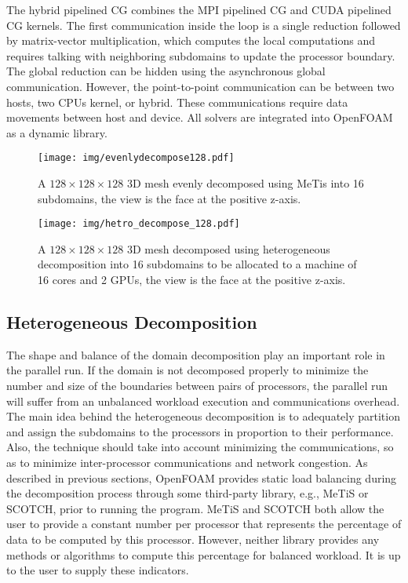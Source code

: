 \documentclass[3p,times]{elsarticle}
\begin{document}
The hybrid pipelined CG combines the MPI pipelined CG and CUDA pipelined CG kernels. The first communication inside the loop is a single reduction followed by matrix-vector multiplication, which computes the local computations and requires talking with neighboring subdomains to update the processor boundary. The global reduction can be hidden using the asynchronous global communication. However, the point-to-point communication can be between two hosts, two CPUs kernel, or hybrid. These communications require data movements between host and device. All solvers are integrated into OpenFOAM as a dynamic library. \\ 
\begin{figure}[t]
\begin{center}
\texttt{[image: img/evenlydecompose128.pdf]} 
\caption{ A $128 \times 128 \times 128$ 3D mesh evenly decomposed using MeTis into 16 subdomains, the view is the face at the positive z-axis.}
\label{pic_evenDecom}
\end{center}
\end{figure}

\begin{figure}[h]
\begin{center}
\texttt{[image: img/hetro\_decompose\_128.pdf]} 
\caption{ A $128 \times 128 \times 128$ 3D mesh decomposed using heterogeneous decomposition into 16 subdomains to be allocated to a machine of 16 cores and 2 GPUs, the view is the face at the positive z-axis.}
\label{pic_hetroDecom}
\end{center}
\end{figure}

\subsection{Heterogeneous Decomposition}

The shape and balance of the domain decomposition play an important role in the parallel run. If the domain is not decomposed properly to minimize the number and size of the boundaries between pairs of processors, the parallel run will suffer from an unbalanced workload execution and communications overhead.  The main idea behind the heterogeneous decomposition is to adequately partition and assign the subdomains to the processors in proportion to their performance. Also, the technique should take into account minimizing the communications, so as to minimize inter-processor communications and network congestion. As described in previous sections, OpenFOAM provides static load balancing during the decomposition process through some third-party library, e.g., MeTiS or SCOTCH, prior to running the program. MeTiS and SCOTCH both allow the user to provide a constant number per processor that represents the percentage of data to be computed by this processor. However, neither library provides any methods or algorithms to compute this percentage for balanced workload. It is up to the user to supply these indicators.  \\
\end{document}
